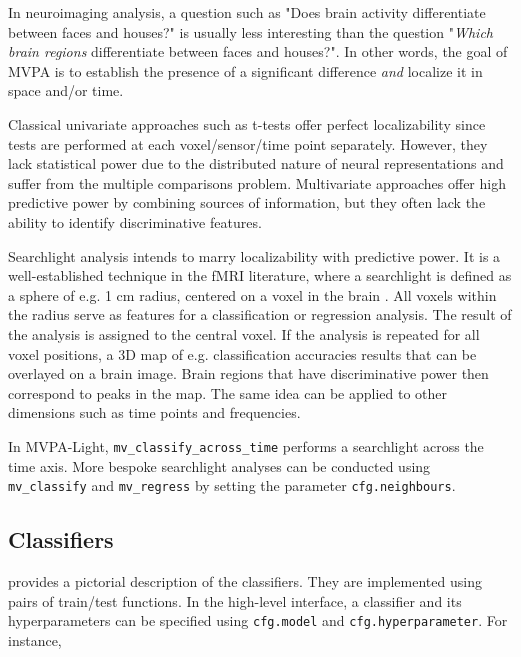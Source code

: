 \documentclass[utf8]{frontiersSCNS} %
\newcommand{\ttt}[1]{\texttt{#1}}
\begin{document}
In neuroimaging analysis, a question such as "Does brain activity differentiate between faces and houses?" is usually less interesting than the question "\textit{Which brain regions} differentiate between faces and houses?". In other words, the goal of MVPA is to establish the presence of a significant difference \textit{and} localize it in space and/or time.

Classical univariate approaches such as t-tests offer perfect localizability since tests are performed at each voxel/sensor/time point separately. However, they lack statistical power due to the distributed nature of neural representations \citep{Haxby2001} and suffer from the multiple comparisons problem. Multivariate approaches  offer high predictive power by combining  sources of information, but they often lack the ability to identify discriminative features.

Searchlight analysis intends to marry localizability with predictive power. It is a well-established technique in the fMRI literature, where a searchlight is defined as a sphere of e.g. 1 cm radius, centered on a voxel in the brain \citep{Kriegeskorte2006Information-basedMapping}. All voxels within the radius serve as features for a classification or regression analysis. The result of the analysis is assigned to the central voxel. If the analysis is repeated for all voxel positions, a 3D map of e.g. classification accuracies results that can be overlayed on a brain image. Brain regions that have discriminative power then correspond to peaks in the map. The same idea can be applied to other dimensions such as time points and  frequencies.

In MVPA-Light, \ttt{mv\_classify\_across\_time} performs a searchlight across the time axis. More bespoke searchlight analyses can be conducted using \ttt{mv\_classify} and \ttt{mv\_regress} by setting the parameter \ttt{cfg.neighbours}.

\subsection{Classifiers}\label{sec:classifiers}

 provides a pictorial description of the classifiers. They are implemented using pairs of train/test functions. In the high-level interface, a classifier and its hyperparameters can be specified using \ttt{cfg.model} and \ttt{cfg.hyperparameter}. For instance,
\end{document}
